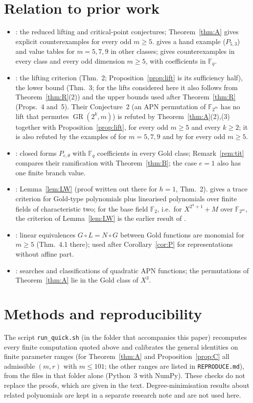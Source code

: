 \documentclass[preprint,12pt]{elsarticle}
\theoremstyle{definition}
\newcommand{\F}{\mathbb{F}}
\newcommand{\GR}{\operatorname{GR}}
\begin{document}
\section{Relation to prior work}
\begin{itemize}
\item \cite{BS}: the reduced lifting and critical-point conjectures; Theorem~\ref{thm:A} gives explicit counterexamples for every odd $m\ge5$. \cite{Stone} gives a hand example ($P_{5,3}$) and value tables for $m=5,7,9$ in other classes; \cite{TIT} gives counterexamples in every class and every odd dimension $m\ge5$, with coefficients in $\F_q$.
\item \cite{RS}: the lifting criterion (Thm.~2; Proposition~\ref{prop:lift} is its sufficiency half), the lower bound (Thm.~3; for the lifts considered here it also follows from Theorem~\ref{thm:R}(2)) and the upper bounds used after Theorem~\ref{thm:R} (Props.~4 and~5). Their Conjecture~2 (an APN permutation of $\F_{2^m}$ has no lift that permutes $\GR(2^k,m)$) is refuted by Theorem~\ref{thm:A}(2),(3) together with Proposition~\ref{prop:lift}, for every odd $m\ge5$ and every $k\ge2$; it is also refuted by the examples of \cite{Stone} for $m=5,7,9$ and by \cite{TIT} for every odd $m\ge5$.
\item \cite[App.~A]{TIT}: closed forms $P_{e,\theta}$ with $\F_q$ coefficients in every Gold class; Remark~\ref{rem:tit} compares their ramification with Theorem~\ref{thm:B}; the case $e=1$ also has one finite branch value.
\item \cite[Thm.~4]{LW}: Lemma~\ref{lem:LW} (proof written out there for $h=1$, Thm.~2). \cite[Thm.~9]{Chen} gives a trace criterion for Gold-type polynomials plus linearised polynomials over finite fields of characteristic two; for the base field $\F_2$, i.e.\ for $X^{2^h+1}+M$ over $\F_{2^m}$, the criterion of Lemma~\ref{lem:LW} is the earlier result of \cite{LW}.
\item \cite{KZ}: linear equivalences $G\circ L=N\circ G$ between Gold functions are monomial for $m\ge5$ (Thm.~4.1 there); used after Corollary~\ref{cor:P} for representations without affine part.
\item \cite{BL,YKBL}: searches and classifications of quadratic APN functions; the permutations of Theorem~\ref{thm:A} lie in the Gold class of $X^3$.
\end{itemize}

\section*{Methods and reproducibility}
The script \texttt{run\_quick.sh} (in the folder that accompanies this paper) recomputes every finite computation quoted above and calibrates the general identities on finite parameter ranges (for Theorem~\ref{thm:A} and Proposition~\ref{prop:C} all admissible $(m,r)$ with $m\le101$; the other ranges are listed in \texttt{REPRODUCE.md}), from the files in that folder alone (Python~3 with NumPy). These checks do not replace the proofs, which are given in the text. Degree-minimisation results about related polynomials are kept in a separate research note and are not used here.
\end{document}

